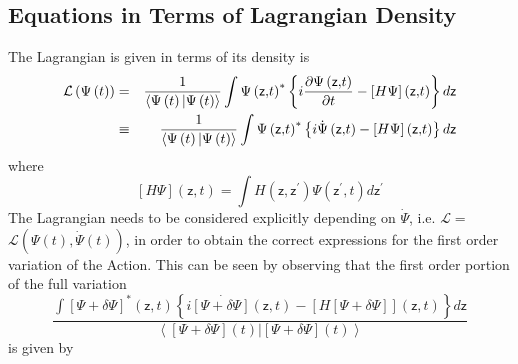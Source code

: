 \documentclass[aps,preprint]{revtex4}
\begin{document}
\subsection{Equations in Terms of Lagrangian Density}

The Lagrangian is given in terms of its density is 
\begin{eqnarray}
\mathcal{L}\left( \Psi \left( t\right) \right) &=&\frac{1}{\left\langle \Psi
\left( t\right) |\Psi \left( t\right) \right\rangle }\int \Psi \left( 
\mathsf{z,}t\right) ^{\ast }\left\{ i\frac{\partial \Psi \left( \mathsf{z,}%
t\right) }{\partial t}-\left[ H\Psi \right] \left( \mathsf{z,}t\right)
\right\} d\mathsf{z} \\
&\equiv &\frac{1}{\left\langle \Psi \left( t\right) |\Psi \left( t\right)
\right\rangle }\int \Psi \left( \mathsf{z,}t\right) ^{\ast }\left\{ i\dot{%
\Psi}\left( \mathsf{z,}t\right) -\left[ H\Psi \right] \left( \mathsf{z,}%
t\right) \right\} d\mathsf{z}
\end{eqnarray}%
where 
\begin{equation}
\left[ H\Psi \right] \left( \mathsf{z,}t\right) =\int H\left( \mathsf{z,z}%
^{\prime }\right) \Psi \left( \mathsf{z}^{\prime }\mathsf{,}t\right) d%
\mathsf{z}^{\prime }
\end{equation}%
The Lagrangian needs to be considered explicitly depending on $\dot{\Psi}$,
i.e. $\mathcal{L=}$ $\mathcal{L}\left( \Psi \left( t\right) ,\dot{\Psi}%
\left( t\right) \right) $, in order to obtain the correct expressions for
the first order variation of the Action. This can be seen by observing that
the first order portion of the full variation 
\begin{equation}
\frac{\int \left[ \Psi +\delta \Psi \right] ^{\ast }\left( \mathsf{z,}%
t\right) \left\{ i\overset{\cdot }{\left[ \Psi +\delta \Psi \right] }\left( 
\mathsf{z,}t\right) -\left[ H\left[ \Psi +\delta \Psi \right] \right] \left( 
\mathsf{z,}t\right) \right\} d\mathsf{z}}{\left\langle \left[ \Psi +\delta
\Psi \right] \left( t\right) |\left[ \Psi +\delta \Psi \right] \left(
t\right) \right\rangle }
\end{equation}%
is given by 
\end{document}
